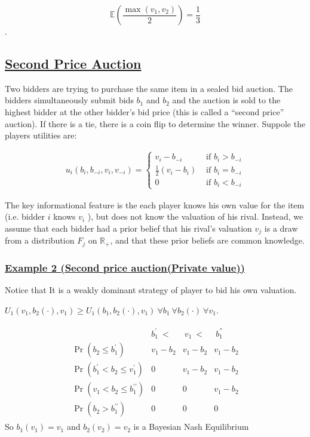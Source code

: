 \documentclass[12pt,a4paper]{article}
\begin{document}
\[\mathbb{E}\left( \frac{\max(v_{1},v_{2})}{2} \right) = \frac{1}{3} \].  

  \subsection{\underline{Second Price Auction}} 

Two bidders are trying to purchase the same item in a sealed bid auction. The bidders simultaneously submit bids \(b_1\) and \(b_2\) and the auction is sold to the highest bidder at the other bidder's bid price (this is called a ``second price'' auction). If there is a tie, there is a coin flip to determine the winner. Suppole the players utilities are:

\begin{align*}
u_i\left(b_i, b_{-i}, v_i, v_{-i}\right)= \begin{cases}v_i-b_{-i} & \text { if } b_i>b_{-i} \\ \frac{1}{2}\left(v_i-b_i\right) & \text { if } b_i=b_{-i} \\ 0 & \text { if } b_i<b_{-i}\end{cases}
\end{align*}


The key informational feature is the each player knows his own value for the item (i.e. bidder \(i\) knows \(v_i\) ), but does not know the valuation of his rival. Instead, we assume that each bidder had a prior belief that his rival's valuation \(v_{j}\) is a draw from a distribution \(F_j\) on \(\mathbb{R}_{+}\), and that these prior beliefs are common knowledge.

 \subsubsection*{  \underline{ Example 2 (Second price auction(Private value)) } } 

Notice that It is a weakly dominant strategy of player to bid his own valuation.

\(U_{1}(v_{1},b_{2}(\cdot),v_{1}) \geq U_{1}(b_{1},b_{2}(\cdot), v_{1}) \ \forall b_{1} \ \forall b_{2}(\cdot) \ \forall v_{1}\).

\begin{align*}
    \begin{array}{c|c|c|c} 
    & b_{1}^{'} \ < & \ v_{1} \ < &\ b_{1}^{''}  \\
    \hline \Pr\left(b_2 \leq b_1^{\prime}\right) & v_1-b_2 & v_1-b_2 & v_1-b_2 \\
    \hline \Pr\left(b_1^{\prime}<b_2 \leq v_1^{\prime}\right) & 0 & v_1-b_2 & v_1-b_2 \\
    \hline \Pr\left(v_1<b_2\leq b_1^{\prime \prime}\right) & 0 & 0 & v_1-b_2 \\
    \hline \Pr\left(b_2>b_1^{\prime \prime}\right) & 0 & 0 & 0
    \end{array}
    \end{align*}
So \(b_{1}(v_{1})=v_{1}\) and \(b_{2}(v_{2})=v_{2}\) is a Bayesian Nash Equilibrium    
\end{document}
